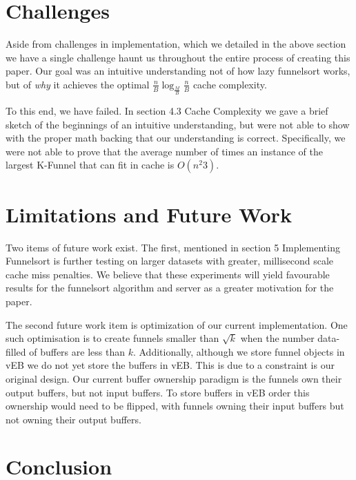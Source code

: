 \documentclass[11pt, letterpaper]{article}
\begin{document}
\section{Challenges}
Aside from challenges in implementation, which we detailed in the above section we have a single challenge haunt us throughout the entire process of creating this paper. Our goal was an intuitive understanding not of how lazy funnelsort works, but of \textit{why} it achieves the optimal $\frac{n}{B}\log_\frac{M}{B}\frac{n}{B}$ cache complexity.

To this end, we have failed. In section 4.3 Cache Complexity we gave a brief sketch of the beginnings of an intuitive understanding, but were not able to show with the proper math backing that our understanding is correct. Specifically, we were not able to prove that the average number of times an instance of the largest K-Funnel that can fit in cache is $O(n^{2}{3})$.

\section{Limitations and Future Work}
Two items of future work exist. The first, mentioned in section 5 Implementing Funnelsort is further testing on larger datasets with greater, millisecond scale cache miss penalties. We believe that these experiments will yield favourable results for the funnelsort algorithm and server as a greater motivation for the paper.

The second future work item is optimization of our current implementation. One such optimisation is to create funnels smaller than $\sqrt{k}$ when the number data-filled of buffers are less than $k$. Additionally, although we store funnel objects in vEB we do not yet store the buffers in vEB. This is due to a constraint is our original design. Our current buffer ownership paradigm is the funnels own their output buffers, but not input buffers. To store buffers in vEB order this ownership would need to be flipped, with funnels owning their input buffers but not owning their output buffers. 

\section{Conclusion}



\printbibliography%
\end{document}
